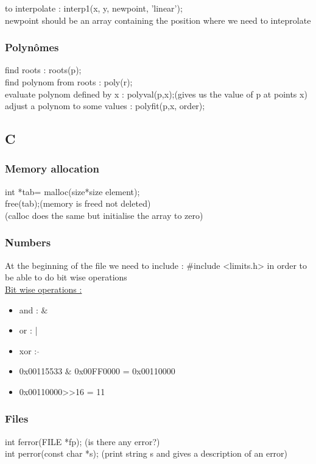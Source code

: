 \documentclass[../main.tex]{subfiles}
\begin{document}
to interpolate : interp1(x, y, newpoint, 'linear');\\
newpoint should be an array containing the position where we need to inteprolate\\

\subsubsection{Polynômes}
find roots : roots(p);\\
find polynom from roots : poly(r);\\
evaluate polynom defined by x : polyval(p,x);(gives us the value of p at points x)\\

adjust a polynom to some values : polyfit(p,x, order);\\

\subsection{C}
\subsubsection{Memory allocation}
int *tab= malloc(size*size element);\\
free(tab);(memory is freed not deleted)\\
(calloc does the same but initialise the array to zero)\\

\subsubsection{Numbers}
At the beginning of the file we need to include : $\#$include <limits.h> in order to be able to do bit wise operations\\

\quad \underline{Bit wise operations :}\\
\begin{itemize}
    \item and : $\&$\\
    \item or : |\\
    \item xor : $\hat{}$ \\

    \item 0x00115533 $\&$ 0x00FF0000 = 0x00110000\\
    \item 0x00110000>>16 = 11\\
\end{itemize}

\subsubsection{Files}
int ferror(FILE *fp); (is there any error?)\\
int perror(const char *s); (print string s and gives a description of an error)\\
\end{document}
